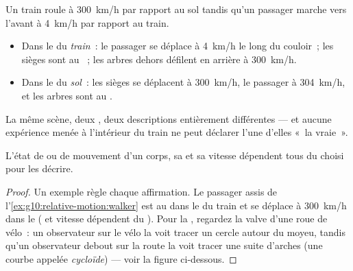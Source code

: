 \begin{example}\label{ex:g10:relative-motion:walker}
Un train roule à \qty{300}{km/h} par rapport au sol tandis qu'un
passager marche vers l'avant à \qty{4}{km/h} par rapport au train.
\begin{itemize}
  \item Dans le  du \emph{train}~: le passager se déplace à
        \qty{4}{km/h} le long du couloir~; les sièges sont au
        ~; les arbres dehors défilent en arrière à
        \qty{300}{km/h}.
  \item Dans le  du \emph{sol}~: les sièges se déplacent à
        \qty{300}{km/h}, le passager à \qty{304}{km/h}, et les arbres
        sont au .
\end{itemize}
La même scène, deux , deux descriptions entièrement
différentes --- et aucune expérience menée à l'intérieur du train ne
peut déclarer l'une d'elles «~la vraie~».
\end{example}

\begin{proposition}\label{prop:g10:relative-motion:relativity}
L'état de  ou de mouvement d'un corps, sa
 et sa vitesse dépendent tous du
 choisi pour les décrire.
\end{proposition}

\begin{proof}
Un exemple règle chaque affirmation. Le passager assis
de l'\cref{ex:g10:relative-motion:walker} est au  dans le
 du train et se déplace à \qty{300}{km/h} dans le
 ( et vitesse dépendent
du ). Pour la , regardez la valve
d'une roue de vélo~: un observateur sur le vélo la voit tracer un
cercle autour du moyeu, tandis qu'un observateur debout sur la route
la voit tracer une suite d'arches (une courbe appelée
\emph{cycloïde}) --- voir la figure ci-dessous.
\end{proof}

